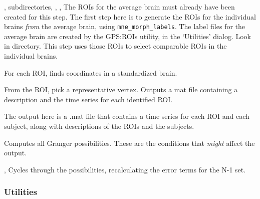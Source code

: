 \documentclass[11pt]{article}
\begin{document}
\begin{itemize}

%
{, subdirectories, %
,
,}
 The ROIs for the average brain must already have been created for
 this step.  The first step here is to generate the ROIs for the
 individual brains \emph{from} the average brain, using
 \texttt{mne\_morph\_labels}. 
The label files for the average brain are created by the GPS:ROIs
  utility, in the `Utilities' dialog.  Look in
   directory.  This step uses those ROIs to select
  comparable ROIs in the individual brains.

%
{} For
each ROI, finds coordinates in a
  standardized brain.  %

%
{}
From the ROI,
pick a representative vertex.  Outputs a mat file containing a
description and the time series for each identified ROI.

%
{} The output here is a .mat file that
contains a time series for each ROI and each subject, along with
descriptions of the ROIs and the subjects.

%
{} Computes all Granger
possibilities.  These are the conditions that \emph{might} affect the output.

%
{,
  }  Cycles through the
possibilities, recalculating the error terms for the N-1 set.

\end{itemize}


\subsubsection{Utilities}
\end{document}
